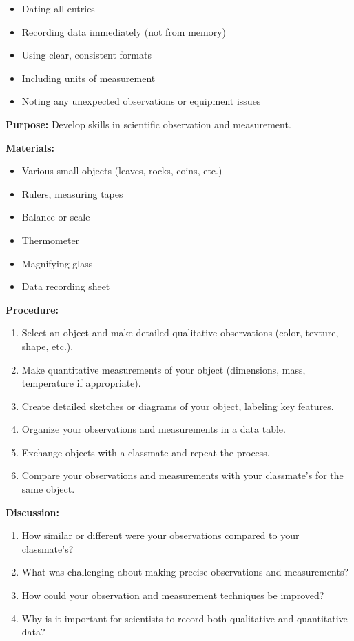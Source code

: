 \documentclass[justified,notoc]{tufte-book}
\newenvironment{investigation}[1]{%
    \begin{tcolorbox}[colback=info!10,colframe=info,title=\textbf{Investigation: #1}]
}{%
    \end{tcolorbox}
}
\begin{document}
\begin{itemize}
    \item Dating all entries
    \item Recording data immediately (not from memory)
    \item Using clear, consistent formats
    \item Including units of measurement
    \item Noting any unexpected observations or equipment issues
\end{itemize}

\begin{investigation}{Practicing Observation and Measurement}
\textbf{Purpose:} Develop skills in scientific observation and measurement.

\textbf{Materials:}
\begin{itemize}
    \item Various small objects (leaves, rocks, coins, etc.)
    \item Rulers, measuring tapes
    \item Balance or scale
    \item Thermometer
    \item Magnifying glass
    \item Data recording sheet
\end{itemize}

\textbf{Procedure:}
\begin{enumerate}
    \item Select an object and make detailed qualitative observations (color, texture, shape, etc.).
    \item Make quantitative measurements of your object (dimensions, mass, temperature if appropriate).
    \item Create detailed sketches or diagrams of your object, labeling key features.
    \item Organize your observations and measurements in a data table.
    \item Exchange objects with a classmate and repeat the process.
    \item Compare your observations and measurements with your classmate's for the same object.
\end{enumerate}

\textbf{Discussion:}
\begin{enumerate}
    \item How similar or different were your observations compared to your classmate's?
    \item What was challenging about making precise observations and measurements?
    \item How could your observation and measurement techniques be improved?
    \item Why is it important for scientists to record both qualitative and quantitative data?
\end{enumerate}
\end{investigation}
\end{document}
